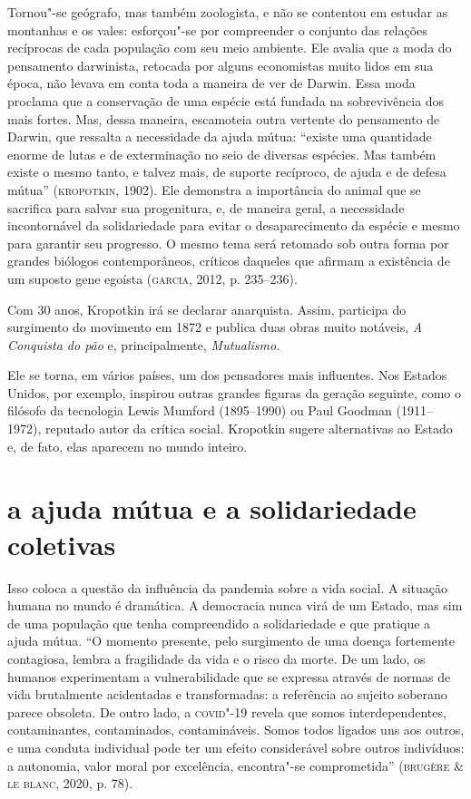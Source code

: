 Tornou"-se geógrafo, mas também zoologista, e não se contentou em estudar
as montanhas e os vales: esforçou"-se por compreender o conjunto das
relações recíprocas de cada população com seu meio ambiente. Ele avalia
que a moda do pensamento darwinista, retocada por alguns economistas
muito lidos em sua época, não levava em conta toda a maneira de ver de
Darwin. Essa moda proclama que a conservação de uma espécie está fundada
na sobrevivência dos mais fortes. Mas, dessa maneira, escamoteia outra
vertente do pensamento de Darwin, que ressalta a necessidade da ajuda
mútua: ``existe uma quantidade enorme de lutas e de exterminação no seio
de diversas espécies. Mas também existe o mesmo tanto, e talvez mais, de
suporte recíproco, de ajuda e de defesa mútua'' (\textsc{kropotkin}, 1902). Ele
demonstra a importância do animal que se sacrifica para salvar sua
progenitura, e, de maneira geral, a necessidade incontornável da
solidariedade para evitar o desaparecimento da espécie e mesmo para
garantir seu progresso. O mesmo tema será retomado sob outra forma por
grandes biólogos contemporâneos, críticos daqueles que afirmam a
existência de um suposto gene egoísta (\textsc{garcia}, 2012, p. 235--236).

Com 30 anos, Kropotkin irá se declarar anarquista. Assim, participa do
surgimento do movimento em 1872 e publica duas obras muito notáveis,
\emph{A Conquista do pão} e, principalmente, \emph{Mutualismo. }

Ele se torna, em vários países, um dos pensadores mais influentes. Nos
Estados Unidos, por exemplo, inspirou outras grandes figuras da geração
seguinte, como o filósofo da tecnologia Lewis Mumford (1895--1990) ou
Paul Goodman (1911--1972), reputado autor da crítica social. Kropotkin
sugere alternativas ao Estado e, de fato, elas aparecem no mundo
inteiro.

\section{a ajuda mútua e a solidariedade coletivas}

Isso coloca a questão da influência da pandemia sobre a vida social. A
situação humana no mundo é dramática. A democracia nunca virá de um
Estado, mas sim de uma população que tenha compreendido a solidariedade
e que pratique a ajuda mútua. ``O momento presente, pelo surgimento de
uma doença fortemente contagiosa, lembra a fragilidade da vida e o risco
da morte. De um lado, os humanos experimentam a vulnerabilidade que se
expressa através de normas de vida brutalmente acidentadas e
transformadas: a referência ao sujeito soberano parece obsoleta. De
outro lado, a \textsc{covid}"-19 revela que somos interdependentes, contaminantes,
contaminados, contamináveis. Somos todos ligados uns aos outros, e uma
conduta individual pode ter um efeito considerável sobre outros
indivíduos: a autonomia, valor moral por excelência, encontra"-se
comprometida'' (\textsc{brugère} \& \textsc{le blanc}, 2020, p. 78).

